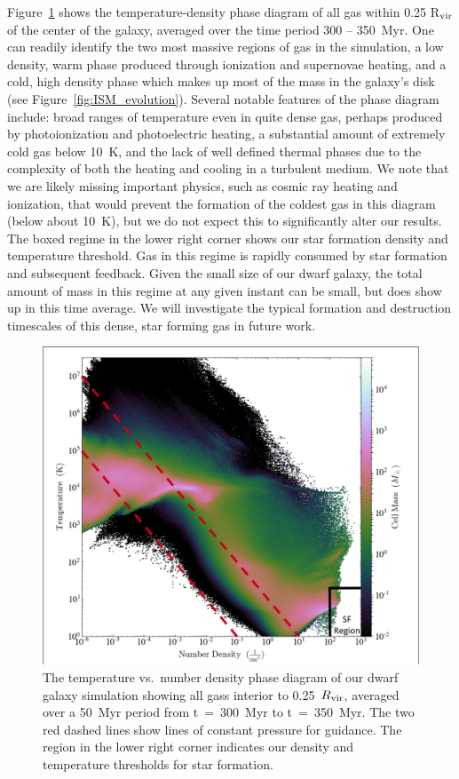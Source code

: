 \documentclass[twocolumn]{aastex61}
\begin{document}
Figure~\ref{fig:phase} shows the temperature-density phase diagram of all gas within 0.25 R$_{\rm vir}$ of the center of the galaxy, averaged over the time period 300 -- 350~Myr. One can readily identify the two most massive regions of gas in the simulation, a low density, warm phase produced through ionization and supernovae heating, and a cold, high density phase which makes up most of the mass in the galaxy's disk (see Figure~\ref{fig:ISM_evolution}). Several notable features of the phase diagram include: broad ranges of temperature even in quite dense gas, perhaps produced by photoionization and photoelectric heating, a substantial amount of extremely cold gas below 10~K, and the lack of well defined thermal phases due to the complexity of both the heating and cooling in a turbulent medium. We note that we are likely missing important physics, such as cosmic ray heating and ionization, that would prevent the formation of the coldest gas in this diagram (below about 10~K), but we do not expect this to significantly alter our results. The boxed regime in the lower right corner shows our star formation density and temperature threshold. Gas in this regime is rapidly consumed by star formation and subsequent feedback. Given the small size of our dwarf galaxy, the total amount of mass in this regime at any given instant can be small, but does show up in this time average. We will investigate the typical formation and destruction timescales of this dense, star forming gas in future work.

\begin{figure}
\centering
\includegraphics[width=0.95\linewidth]{phase_diagram.png}
\caption{The temperature vs.\ number density phase diagram of our dwarf galaxy simulation showing all gass interior to 0.25~$R_{\rm vir}$, averaged over a 50~Myr period from t~=~300~Myr to t~=~350~Myr. The two red dashed lines show lines of constant pressure for guidance. The region in the lower right corner indicates our density and temperature thresholds for star formation.}
\label{fig:phase}
\end{figure} 
\end{document}

